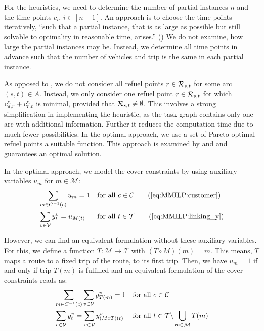For the heuristics, we need to determine the number of partial instances $n$ and the time points $c_i$, ${i\in[n-1]}$. An approach is to choose the time points iteratively, \enquote{such that a partial instance, that is as large as possible but still solvable to optimality in reasonable time, arises.} (\cite[p.~131]{Knoll}) We do not examine, how large the partial instances may be. Instead, we determine all time points in advance such that the number of vehicles and trip is the same in each partial instance.

As opposed to , we do not consider all refuel points $r\in\mathcal{R}_{s,t}$ for some arc $(s,t)\in A$. Instead, we only consider one refuel point $r\in\mathcal{R}_{s,t}$ for which ${c^{\operatorname{d}}_{s,r} + c^{\operatorname{d}}_{r,t}}$ is minimal, provided that ${\mathcal{R}_{s,t}\neq\emptyset}$. This involves a strong simplification in implementing the heuristic, as the task graph contains only one arc with additional information. Further it reduces the computation time due to much fewer possibilities. In the optimal approach, we use a set of Pareto-optimal refuel points \wrt a suitable function. This approach is examined by \cite[Sec.~3.2.2]{Kaiser} and \cite[Sec.~3.2.2]{Knoll} and guarantees an optimal solution.

In the optimal approach, we model the cover constraints by using auxiliary variables $u_m$ for ${m\in\mathcal{M}}$:
\begin{align*}
	& \sum_{m\in C^{-1}(c)} u_m = 1 && \text{for all } c\in\mathcal{C} \tag{\ref{eq:MMILP:customer}} \\
	& \sum_{v\in\mathcal{V}} y^v_t = u_{M(t)} && \text{for all } t\in\mathcal{T} \tag{\ref{eq:MMILP:linking_y}}
\end{align*}

However, we can find an equivalent formulation without these auxiliary variables. For this, we define a function ${T:\mathcal{M}\to\mathcal{T}}$ with ${\left(T\circ M\right)(m)=m}$. This means, $T$ maps a route to a fixed trip of the route, \eg to its first trip. Then, we have ${u_m=1}$ if and only if trip $T(m)$ is fulfilled and an equivalent formulation of the cover constraints reads as:
\begin{align*}
	& \sum_{m\in C^{-1}(c)} \sum_{v\in\mathcal{V}} y^v_{T(m)} = 1 && \text{for all } c\in\mathcal{C} \\
	& \sum_{v\in\mathcal{V}} y^v_t = \sum_{v\in\mathcal{V}} y^v_{(M\circ T)(t)} && \text{for all } t\in\mathcal{T}\backslash\bigcup_{m\in\mathcal{M}} T(m)
\end{align*}

